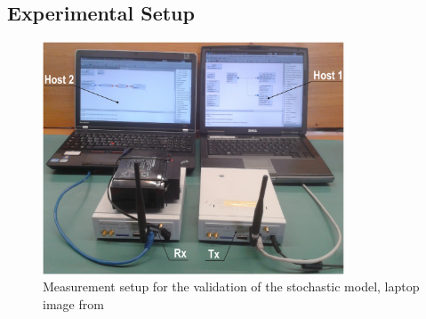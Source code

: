 \subsection{Experimental Setup}

\begin{figure}
	\centering
	\includegraphics[width=0.8\textwidth]{figures/setup}
	\caption{Measurement setup for the validation of the stochastic model, laptop image from \cite{Laptop}}
	\label{messaufbau}
\end{figure}


